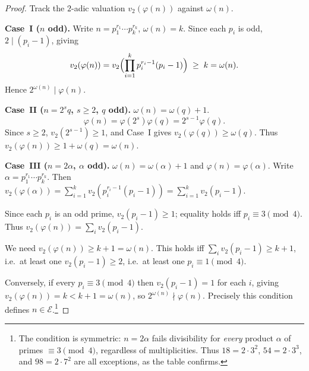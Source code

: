 \documentclass[10pt,a4paper]{amsart}
\newcommand{\Exc}{\mathcal{E}}
\renewcommand{\phi}{\varphi}
\begin{document}
\begin{proof}
Track the $2$-adic valuation $v_2(\phi(n))$ against $\omega(n)$.

\smallskip\noindent
\textbf{Case~I ($n$ odd).}\;
Write $n=p_1^{r_1}\cdots p_k^{r_k}$, $\omega(n)=k$.
Since each $p_i$ is odd, $2\mid(p_i-1)$, giving
\[
  v_2(\phi(n))=v_2\Bigl(\prod_{i=1}^k p_i^{r_i-1}(p_i-1)\Bigr)
  \;\ge\; k=\omega(n).
\]
Hence $2^{\omega(n)}\mid\phi(n)$.

\smallskip\noindent
\textbf{Case~II ($n=2^s q$, $s\ge2$, $q$ odd).}\;
$\omega(n)=\omega(q)+1$.
\[
  \phi(n)=\phi(2^s)\phi(q)=2^{s-1}\phi(q).
\]
Since $s\ge2$, $v_2(2^{s-1})\ge1$, and Case~I gives
$v_2(\phi(q))\ge\omega(q)$.  Thus $v_2(\phi(n))\ge1+\omega(q)=\omega(n)$.

\smallskip\noindent
\textbf{Case~III ($n=2\alpha$, $\alpha$ odd).}\;
$\omega(n)=\omega(\alpha)+1$ and $\phi(n)=\phi(\alpha)$.
Write $\alpha=p_1^{r_1}\cdots p_k^{r_k}$.  Then
$v_2(\phi(\alpha))=\sum_{i=1}^k v_2(p_i^{r_i-1}(p_i-1))=\sum_{i=1}^k v_2(p_i-1)$.

Since each $p_i$ is an odd prime,
$v_2(p_i-1)\ge1$; equality holds iff $p_i\equiv3\pmod4$.
Thus $v_2(\phi(n))=\sum_i v_2(p_i-1)$.

We need $v_2(\phi(n))\ge k+1=\omega(n)$.  This holds iff
$\sum_i v_2(p_i-1)\ge k+1$, i.e.\ at least one $v_2(p_i-1)\ge2$,
i.e.\ at least one $p_i\equiv1\pmod4$.

Conversely, if every $p_i\equiv3\pmod4$ then $v_2(p_i-1)=1$ for each
$i$, giving $v_2(\phi(n))=k<k+1=\omega(n)$, so
$2^{\omega(n)}\nmid\phi(n)$.
Precisely this condition defines $n\in\Exc$.\footnote{%
  The condition is symmetric: $n=2\alpha$ fails divisibility for
  \emph{every} product $\alpha$ of primes $\equiv3\pmod4$, regardless
  of multiplicities.  Thus $18=2\cdot3^2$, $54=2\cdot3^3$, and
  $98=2\cdot7^2$ are all exceptions, as the table confirms.}
\qedhere
\end{proof}
\end{document}

